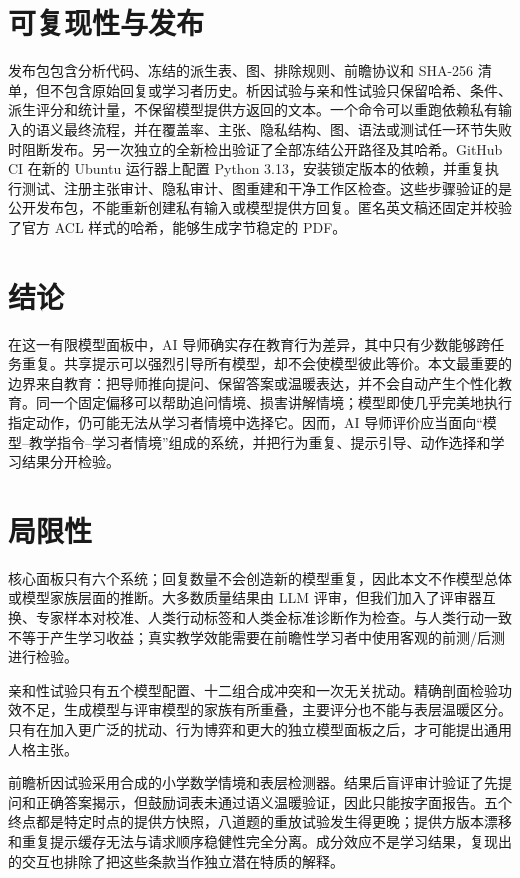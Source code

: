 \documentclass[11pt,a4paper,UTF8]{ctexart}
\begin{document}
\section{可复现性与发布}

发布包包含分析代码、冻结的派生表、图、排除规则、前瞻协议和 SHA-256 清单，但不包含原始回复或学习者历史。析因试验与亲和性试验只保留哈希、条件、派生评分和统计量，不保留模型提供方返回的文本。一个命令可以重跑依赖私有输入的语义最终流程，并在覆盖率、主张、隐私结构、图、语法或测试任一环节失败时阻断发布。另一次独立的全新检出验证了全部冻结公开路径及其哈希。GitHub CI 在新的 Ubuntu 运行器上配置 Python 3.13，安装锁定版本的依赖，并重复执行测试、注册主张审计、隐私审计、图重建和干净工作区检查。这些步骤验证的是公开发布包，不能重新创建私有输入或模型提供方回复。匿名英文稿还固定并校验了官方 ACL 样式的哈希，能够生成字节稳定的 PDF。

\section{结论}

在这一有限模型面板中，AI 导师确实存在教育行为差异，其中只有少数能够跨任务重复。共享提示可以强烈引导所有模型，却不会使模型彼此等价。本文最重要的边界来自教育：把导师推向提问、保留答案或温暖表达，并不会自动产生个性化教育。同一个固定偏移可以帮助追问情境、损害讲解情境；模型即使几乎完美地执行指定动作，仍可能无法从学习者情境中选择它。因而，AI 导师评价应当面向“模型--教学指令--学习者情境”组成的系统，并把行为重复、提示引导、动作选择和学习结果分开检验。

\section*{局限性}

核心面板只有六个系统；回复数量不会创造新的模型重复，因此本文不作模型总体或模型家族层面的推断。大多数质量结果由 LLM 评审，但我们加入了评审器互换、专家样本对校准、人类行动标签和人类金标准诊断作为检查。与人类行动一致不等于产生学习收益；真实教学效能需要在前瞻性学习者中使用客观的前测/后测进行检验。

亲和性试验只有五个模型配置、十二组合成冲突和一次无关扰动。精确剖面检验功效不足，生成模型与评审模型的家族有所重叠，主要评分也不能与表层温暖区分。只有在加入更广泛的扰动、行为博弈和更大的独立模型面板之后，才可能提出通用人格主张。

前瞻析因试验采用合成的小学数学情境和表层检测器。结果后盲评审计验证了先提问和正确答案揭示，但鼓励词表未通过语义温暖验证，因此只能按字面报告。五个终点都是特定时点的提供方快照，八道题的重放试验发生得更晚；提供方版本漂移和重复提示缓存无法与请求顺序稳健性完全分离。成分效应不是学习结果，复现出的交互也排除了把这些条款当作独立潜在特质的解释。
\end{document}
